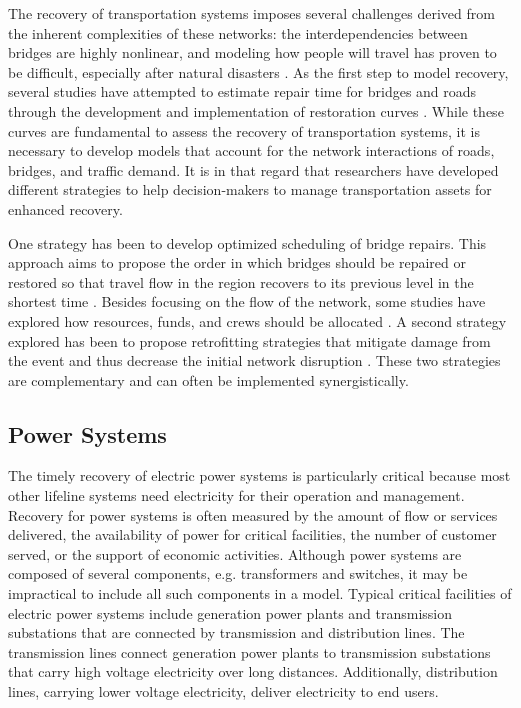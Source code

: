 The recovery of transportation systems imposes several challenges derived from the inherent complexities of these networks: the interdependencies between bridges are highly nonlinear, and modeling how people will travel has proven to be difficult, especially after natural disasters \citep{chang2010transportation}. As the first step to model recovery, several studies have attempted to estimate repair time for bridges and roads through the development and implementation of restoration curves \citep{HAZUS-MH2015,padgett2007bridge}. While these curves are fundamental to assess the recovery of transportation systems, it is necessary to develop models that account for the network interactions of roads, bridges, and traffic demand. It is in that regard that researchers have developed different strategies to help decision-makers to manage transportation assets for enhanced recovery.

One strategy has been to develop optimized scheduling of bridge repairs. This approach aims to propose the order in which bridges should be repaired or restored so that travel flow in the region recovers to its previous level in the shortest time \citep{vugrin2014optimal}. Besides focusing on the flow of the network, some studies have explored how resources, funds, and crews should be allocated \citep{karlaftis2007fund}. A second strategy explored has been to propose retrofitting strategies that mitigate damage from the event and thus decrease the initial network disruption \citep{zhang2016resilience}. These two strategies are complementary and can often be implemented synergistically.\ 

\subsection{Power Systems}
The timely recovery of electric power systems is particularly critical because most other lifeline systems need electricity for their operation and management. Recovery for power systems is often measured by the amount of flow or services delivered, the availability of power for critical facilities, the number of customer served, or the support of economic activities. Although power systems are composed of several components, e.g. transformers and switches, it may be impractical to include all such components in a model. Typical critical facilities of electric power systems include generation power plants and transmission substations that are connected by transmission and distribution lines. The transmission lines connect generation power plants to transmission substations that carry high voltage electricity over long distances. Additionally, distribution lines, carrying lower voltage electricity, deliver electricity to end users. \

